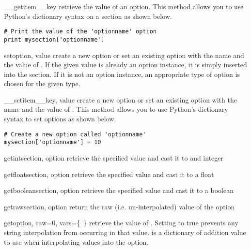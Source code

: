 \documentclass{manual}
\begin{document}
\begin{methoddesc}[ConfigSection]{\_\_getitem\_\_}{key}
retrieve the value of an option.  This method allows you to use Python's 
dictionary syntax on a section as shown below.
\begin{verbatim}
# Print the value of the 'optionname' option
print mysection['optionname'] 
\end{verbatim}
\end{methoddesc}

\begin{methoddesc}[ConfigSection]{set}{option, value}
create a new option or set an existing option with the name 
 and the value of .
If the given value is already an option instance, it is simply inserted
into the section.  If it is not an option instance, an appropriate type
of option is chosen for the given type.
\end{methoddesc}

\begin{methoddesc}[ConfigSection]{\_\_setitem\_\_}{key, value}
create a new option or set an existing option with the name  and
the value of .  This method allows you to use Python's 
dictionary syntax to set options as shown below.
\begin{verbatim}
# Create a new option called 'optionname'
mysection['optionname'] = 10
\end{verbatim}
\end{methoddesc}

\begin{methoddesc}[ConfigManager]{getint}{section, option}
retrieve the specified value and cast it to and integer
\end{methoddesc}

\begin{methoddesc}[ConfigManager]{getfloat}{section, option}
retrieve the specified value and cast it to a float
\end{methoddesc}

\begin{methoddesc}[ConfigManager]{getboolean}{section, option}
retrieve the specified value and cast it to a boolean
\end{methoddesc}

\begin{methoddesc}[ConfigManager]{getraw}{section, option}
return the raw (i.e. un-interpolated) value of the option
\end{methoddesc}

\begin{methoddesc}[ConfigManager]{get}{option, raw=0, vars=\{~\}}
retrieve the value of .
Setting  to true prevents any string interpolation from occurring
in that value.   is a dictionary of addition value to use 
when interpolating values into the option.

\end{methoddesc}
\end{document}
